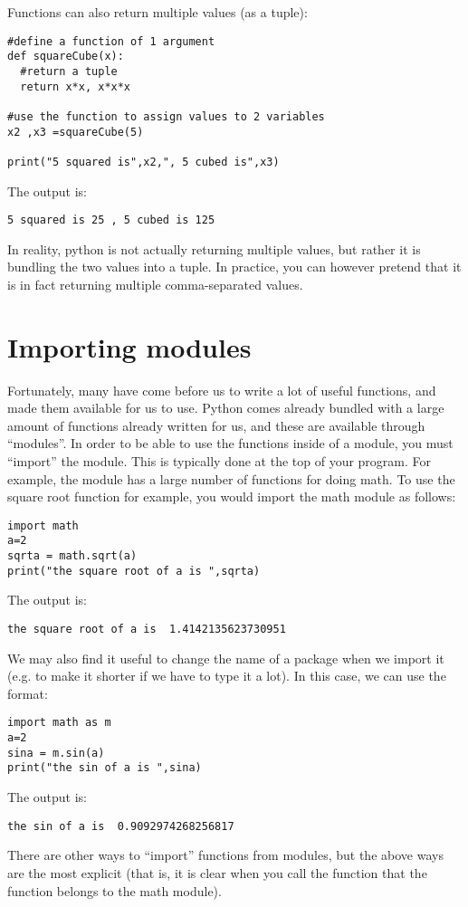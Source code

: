 Functions can also return multiple values (as a tuple):
\begin{lstlisting}[frame=single] 
#define a function of 1 argument
def squareCube(x):
  #return a tuple
  return x*x, x*x*x

#use the function to assign values to 2 variables
x2 ,x3 =squareCube(5)

print("5 squared is",x2,", 5 cubed is",x3)
\end{lstlisting}
The output is:
\begin{verbatim}
5 squared is 25 , 5 cubed is 125
\end{verbatim}
In reality, python is not actually returning multiple values, but rather it is bundling the two values into a tuple. In practice, you can however pretend that it is in fact returning multiple comma-separated values.

\section{Importing modules}
Fortunately, many have come before us to write a lot of useful functions, and made them available for us to use. Python comes already bundled with a large amount of functions already written for us, and these are available through ``modules''. In order to be able to use the functions inside of a module, you must ``import'' the module. This is typically done at the top of your program. For example, the  module has a large number of functions for doing math. To use the square root function for example, you would import the math module as follows:
\begin{lstlisting}[frame=single] 
import math
a=2
sqrta = math.sqrt(a)
print("the square root of a is ",sqrta)
\end{lstlisting}
The output is:
\begin{verbatim}
the square root of a is  1.4142135623730951
\end{verbatim}
We may also find it useful to change the name of a package when we import it (e.g. to make it shorter if we have to type it a lot). In this case, we can use the  format:
\begin{lstlisting}[frame=single] 
import math as m
a=2
sina = m.sin(a)
print("the sin of a is ",sina)
\end{lstlisting}
The output is:
\begin{verbatim}
the sin of a is  0.9092974268256817
\end{verbatim}
There are other ways to ``import'' functions from modules, but the above ways are the most explicit (that is, it is clear when you call the function  that the function belongs to the math module).

